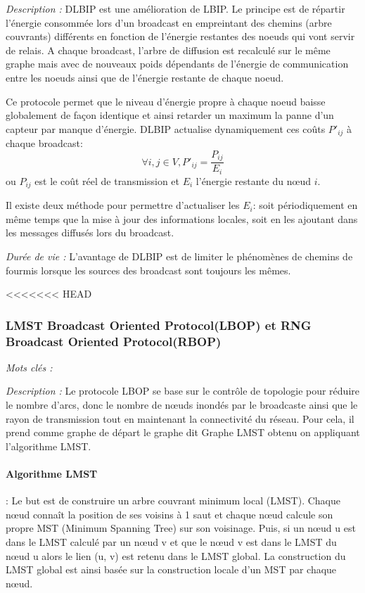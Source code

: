 \emph{Description :} DLBIP est une amélioration de LBIP. Le principe est de répartir l'énergie consommée lors 
d'un broadcast en empreintant des chemins (arbre couvrants) différents en fonction de l'énergie restantes des 
noeuds qui vont servir de relais. A chaque broadcast, l'arbre de diffusion est recalculé sur le même graphe mais
avec de nouveaux poids dépendants de l'énergie de communication entre les noeuds ainsi que de l'énergie restante
de chaque noeud.

Ce protocole permet que le niveau d'énergie propre à chaque noeud baisse globalement de façon identique et ainsi 
retarder un maximum la panne d'un capteur par manque d'énergie.
DLBIP actualise dynamiquement ces coûts $P'_{ij}$ à chaque broadcast:
$$ \forall i,j \in V, P'_{ij}=\frac{P_{ij}}{E_i}$$
ou $P_{ij}$ est le coût réel de transmission et $E_i$ l'énergie restante du nœud $i$.

Il existe deux méthode pour permettre d'actualiser les $E_i$: soit périodiquement en même temps que la mise à jour des informations locales, soit en les ajoutant dans les messages diffusés lors du broadcast.




\emph{Durée de vie :} L'avantage de DLBIP est de limiter le phénomènes de chemins de fourmis lorsque les sources des broadcast sont toujours les mêmes.





<<<<<<< HEAD
\subsubsection{LMST Broadcast Oriented Protocol(LBOP) et  RNG Broadcast Oriented Protocol(RBOP) \cite{Cartigny2005}}
\emph{Mots clés :} 

\emph{Description :} Le protocole LBOP se base sur le contrôle de topologie pour réduire le nombre d'arcs, donc le nombre de nœuds inondés par le broadcaste ainsi que le rayon de transmission tout en maintenant la connectivité du réseau. Pour cela, il prend comme graphe de départ le graphe dit Graphe LMST obtenu on appliquant l’algorithme LMST.

\paragraph{Algorithme LMST}:
Le but est de construire un arbre couvrant minimum local (LMST). Chaque nœud connaît la position de ses voisins à 1 saut et chaque nœud calcule son propre MST (Minimum Spanning Tree) sur son voisinage. Puis, si un nœud u est dans le LMST calculé par un nœud v et que le nœud v est dans le LMST du nœud u alors le lien (u, v) est retenu dans le LMST global. La construction du LMST global est ainsi basée sur la construction locale d’un MST par chaque nœud.
